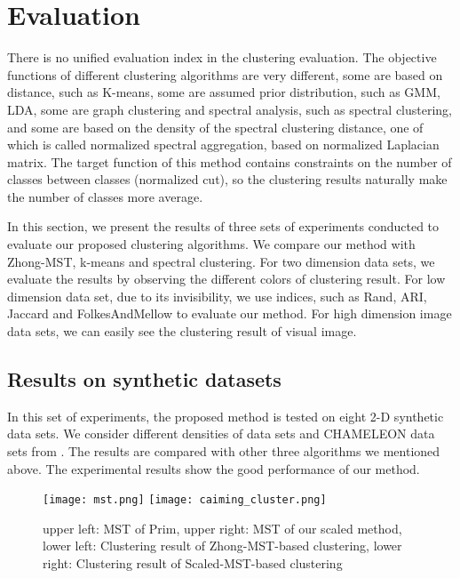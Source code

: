 \section{Evaluation}
	There is no unified evaluation index in the clustering evaluation. The objective functions of different clustering algorithms are very different, some are based on distance, such as K-means, some are assumed prior distribution, such as GMM, LDA, some are graph clustering and spectral analysis, such as spectral clustering, and some are based on the density of the spectral clustering distance, one of which is called normalized spectral aggregation, based on normalized Laplacian matrix. The target function of this method contains constraints on the number of classes between classes (normalized cut), so the clustering results naturally make the number of classes more average. 

	In this section, we present the results of three sets of experiments conducted to evaluate our proposed clustering algorithms. We compare our method with Zhong-MST\cite{fast_mst_zhong}, k-means and spectral clustering. For two dimension data sets, we evaluate the results by observing the different colors of clustering result. For low dimension data set, due to its invisibility, we use indices, such as Rand, ARI, Jaccard and FolkesAndMellow to evaluate our method. For high dimension image data sets, we can easily see the clustering result of visual image.    

	\subsection{Results on synthetic datasets}
		In this set of experiments, the proposed method is tested on eight 2-D synthetic data sets. We consider different densities of data sets and CHAMELEON data sets from \cite{Karypis2008CHAMELEON}. The results are compared with other three algorithms we mentioned above. The experimental results show the good performance of our method.  
		\par
		\begin{figure}[htb]
	        \centering
	        \texttt{[image: mst.png]}
	        \texttt{[image: caiming\_cluster.png]}
	        \caption{upper left: MST of Prim, upper right: MST of our scaled method, lower left: Clustering result of Zhong-MST-based clustering, lower right: Clustering result of Scaled-MST-based clustering}
	    \end{figure}
	
